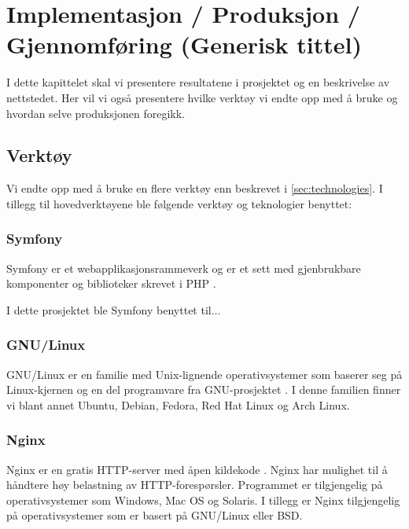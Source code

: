 \cleardoublepage
\chapter{Implementasjon / Produksjon / Gjennomføring (Generisk tittel)}
\label{chap:implementation} 
\clearpage


I dette kapittelet skal vi presentere resultatene i prosjektet og en beskrivelse av nettstedet. Her vil vi også presentere hvilke verktøy vi endte opp med å bruke og hvordan selve produksjonen foregikk.

\section{Verktøy}
Vi endte opp med å bruke en flere verktøy enn beskrevet i  \ref{sec:technologies}. 
I tillegg til hovedverktøyene ble følgende verktøy og teknologier benyttet:

\subsection{Symfony}
\label{sec:tools-symfony}
Symfony er et webapplikasjonsrammeverk og er et sett med gjenbrukbare komponenter og biblioteker skrevet i PHP \cite{symfony19wis}. 

I dette prosjektet ble Symfony benyttet til...

\subsection{GNU/Linux}
GNU/Linux er en familie med Unix-lignende operativsystemer som baserer seg på Linux-kjernen \cite{kernel_org} og en del programvare fra GNU-prosjektet \cite{gnu_org}. I denne familien finner vi blant annet Ubuntu, Debian, Fedora, Red Hat Linux og Arch Linux.

\subsection{Nginx}
Nginx er en gratis HTTP-server med åpen kildekode \cite{nedelcu2010nginx}. Nginx har mulighet til å håndtere høy belastning av HTTP-forespørsler. Programmet er tilgjengelig på operativsystemer som Windows, Mac OS og Solaris. I tillegg er Nginx tilgjengelig på operativsystemer som er basert på GNU/Linux eller BSD.

